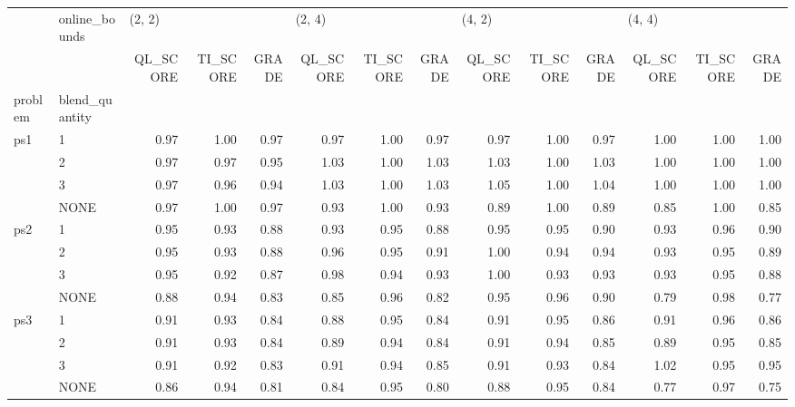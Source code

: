 \begin{tabular}{llrrrrrrrrrrrr}
\toprule
    & online\_bounds & \multicolumn{3}{l}{(2, 2)} & \multicolumn{3}{l}{(2, 4)} & \multicolumn{3}{l}{(4, 2)} & \multicolumn{3}{l}{(4, 4)} \\
    & {} & QL\_SCORE & TI\_SCORE & GRADE & QL\_SCORE & TI\_SCORE & GRADE & QL\_SCORE & TI\_SCORE & GRADE & QL\_SCORE & TI\_SCORE & GRADE \\
problem & blend\_quantity &          &          &       &          &          &       &          &          &       &          &          &       \\
\midrule
ps1 & 1 &     0.97 &     1.00 &  0.97 &     0.97 &     1.00 &  0.97 &     0.97 &     1.00 &  0.97 &     1.00 &     1.00 &  1.00 \\
    & 2 &     0.97 &     0.97 &  0.95 &     1.03 &     1.00 &  1.03 &     1.03 &     1.00 &  1.03 &     1.00 &     1.00 &  1.00 \\
    & 3 &     0.97 &     0.96 &  0.94 &     1.03 &     1.00 &  1.03 &     1.05 &     1.00 &  1.04 &     1.00 &     1.00 &  1.00 \\
    & NONE &     0.97 &     1.00 &  0.97 &     0.93 &     1.00 &  0.93 &     0.89 &     1.00 &  0.89 &     0.85 &     1.00 &  0.85 \\
ps2 & 1 &     0.95 &     0.93 &  0.88 &     0.93 &     0.95 &  0.88 &     0.95 &     0.95 &  0.90 &     0.93 &     0.96 &  0.90 \\
    & 2 &     0.95 &     0.93 &  0.88 &     0.96 &     0.95 &  0.91 &     1.00 &     0.94 &  0.94 &     0.93 &     0.95 &  0.89 \\
    & 3 &     0.95 &     0.92 &  0.87 &     0.98 &     0.94 &  0.93 &     1.00 &     0.93 &  0.93 &     0.93 &     0.95 &  0.88 \\
    & NONE &     0.88 &     0.94 &  0.83 &     0.85 &     0.96 &  0.82 &     0.95 &     0.96 &  0.90 &     0.79 &     0.98 &  0.77 \\
ps3 & 1 &     0.91 &     0.93 &  0.84 &     0.88 &     0.95 &  0.84 &     0.91 &     0.95 &  0.86 &     0.91 &     0.96 &  0.86 \\
    & 2 &     0.91 &     0.93 &  0.84 &     0.89 &     0.94 &  0.84 &     0.91 &     0.94 &  0.85 &     0.89 &     0.95 &  0.85 \\
    & 3 &     0.91 &     0.92 &  0.83 &     0.91 &     0.94 &  0.85 &     0.91 &     0.93 &  0.84 &     1.02 &     0.95 &  0.95 \\
    & NONE &     0.86 &     0.94 &  0.81 &     0.84 &     0.95 &  0.80 &     0.88 &     0.95 &  0.84 &     0.77 &     0.97 &  0.75 \\
\bottomrule
\end{tabular}
